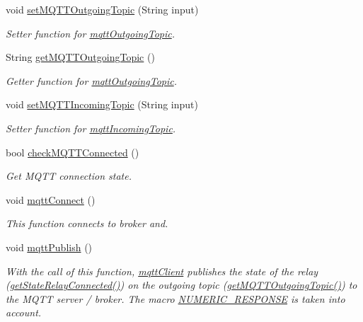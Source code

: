 \begin{DoxyCompactItemize}
void \hyperlink{WIFIOnOff_8ino_a26ae153af75c3844e61d4cd39be0b9d9}{set\-M\-Q\-T\-T\-Outgoing\-Topic} (String input)
\begin{DoxyCompactList}\small\item\em Setter function for \hyperlink{WIFIOnOff_8ino_a2311f2b74fe46d3f9e8072b3694deee5}{mqtt\-Outgoing\-Topic}. \end{DoxyCompactList}\item 
String \hyperlink{WIFIOnOff_8ino_a92b654456d82f73760cda8b83c5a0ca6}{get\-M\-Q\-T\-T\-Outgoing\-Topic} ()
\begin{DoxyCompactList}\small\item\em Getter function for \hyperlink{WIFIOnOff_8ino_a2311f2b74fe46d3f9e8072b3694deee5}{mqtt\-Outgoing\-Topic}. \end{DoxyCompactList}\item 
void \hyperlink{WIFIOnOff_8ino_a4beec40a2400bae93ac3aa8e2f701d13}{set\-M\-Q\-T\-T\-Incoming\-Topic} (String input)
\begin{DoxyCompactList}\small\item\em Setter function for \hyperlink{WIFIOnOff_8ino_a686cf2365a7075bc5f72d01c99b3a9f2}{mqtt\-Incoming\-Topic}. \end{DoxyCompactList}\item 
bool \hyperlink{WIFIOnOff_8ino_af5189bf4d6c6b3d4a90bf76335456740}{check\-M\-Q\-T\-T\-Connected} ()
\begin{DoxyCompactList}\small\item\em Get M\-Q\-T\-T connection state. \end{DoxyCompactList}\item 
void \hyperlink{WIFIOnOff_8ino_a9ad5cb858c24c53a6eaa846b713bd120}{mqtt\-Connect} ()
\begin{DoxyCompactList}\small\item\em This function connects to broker and. \end{DoxyCompactList}\item 
void \hyperlink{WIFIOnOff_8ino_a92e8e72a8c9bd699aefa63b65c4bc30c}{mqtt\-Publish} ()
\begin{DoxyCompactList}\small\item\em With the call of this function, \hyperlink{WIFIOnOff_8ino_a0524591f2a058a4f26f16579245db356}{mqtt\-Client} publishes the state of the relay (\hyperlink{WIFIOnOff_8ino_aefabc9bd763a51753669e6c249140abc}{get\-State\-Relay\-Connected()}) on the outgoing topic (\hyperlink{WIFIOnOff_8ino_a92b654456d82f73760cda8b83c5a0ca6}{get\-M\-Q\-T\-T\-Outgoing\-Topic()}) to the M\-Q\-T\-T server / broker. The macro \hyperlink{WIFIOnOff_8ino_a59912dabf54ca43542cdc292e80d5742}{N\-U\-M\-E\-R\-I\-C\-\_\-\-R\-E\-S\-P\-O\-N\-S\-E} is taken into account. \end{DoxyCompactList}\item 

\end{DoxyCompactItemize}
